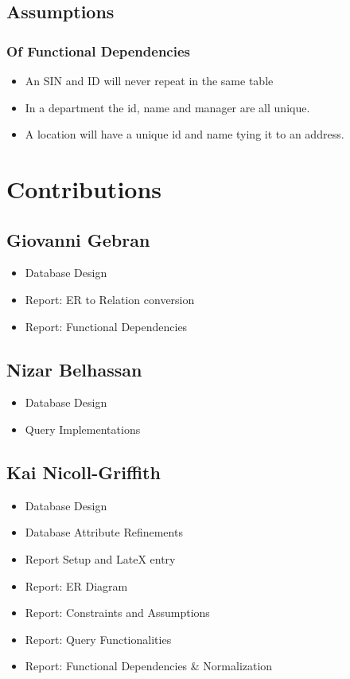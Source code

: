 \documentclass[fleqn, 11pt,letterpaper]{article}
\begin{document}
\subsection{Assumptions}
\subsubsection{Of Functional Dependencies}
\begin{itemize}
	\item An SIN and ID will never repeat in the same table
	\item In a department the id, name and manager are all unique.
	\item A location will have a unique id and name tying it to an address.
\end{itemize}
\pagebreak

\section{Contributions}
\subsection{Giovanni Gebran}
 \begin{itemize}
\item Database Design
\item Report: ER to Relation conversion 
\item Report: Functional Dependencies
\end{itemize}
\subsection{Nizar Belhassan}
 \begin{itemize}
\item Database Design
\item Query Implementations
\end{itemize}
\subsection{Kai Nicoll-Griffith}
 \begin{itemize}
\item Database Design
\item Database Attribute Refinements
\item Report Setup and LateX entry
\item Report: ER Diagram
\item Report: Constraints and Assumptions
\item Report: Query Functionalities
\item Report: Functional Dependencies \& Normalization
\end{itemize}
\end{document}
